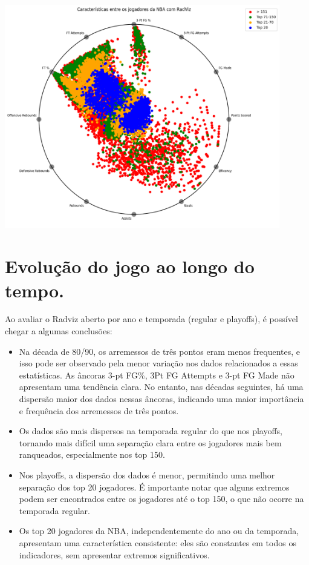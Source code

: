 \documentclass[
]{book}
\begin{document}
\includegraphics[width=0.9\textwidth,height=\textheight]{imagens/40.png}

\hypertarget{evoluuxe7uxe3o-do-jogo-ao-longo-do-tempo.}{%
\chapter{Evolução do jogo ao longo do tempo.}\label{evoluuxe7uxe3o-do-jogo-ao-longo-do-tempo.}}

Ao avaliar o Radviz aberto por ano e temporada (regular e playoffs), é possível chegar a algumas conclusões:

\begin{itemize}
\item
  Na década de 80/90, os arremessos de três pontos eram menos frequentes, e isso pode ser observado pela menor variação nos dados relacionados a essas estatísticas. As âncoras 3-pt FG\%, 3Pt FG Attempts e 3-pt FG Made não apresentam uma tendência clara. No entanto, nas décadas seguintes, há uma dispersão maior dos dados nessas âncoras, indicando uma maior importância e frequência dos arremessos de três pontos.
\item
  Os dados são mais dispersos na temporada regular do que nos playoffs, tornando mais difícil uma separação clara entre os jogadores mais bem ranqueados, especialmente nos top 150.
\item
  Nos playoffs, a dispersão dos dados é menor, permitindo uma melhor separação dos top 20 jogadores. É importante notar que alguns extremos podem ser encontrados entre os jogadores até o top 150, o que não ocorre na temporada regular.
\item
  Os top 20 jogadores da NBA, independentemente do ano ou da temporada, apresentam uma característica consistente: eles são constantes em todos os indicadores, sem apresentar extremos significativos.
\end{itemize}
\end{document}
